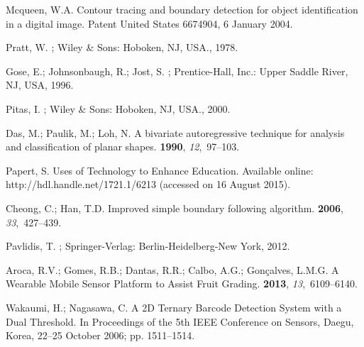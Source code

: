 \documentclass[sensors,article,accept,moreauthors,pdftex,10pt,a4paper]{mdpi}
\begin{document}
\begin{thebibliography}{999} 

Mcqueen, W.A.
\newblock Contour tracing and boundary detection for object identification in a
 digital image.
\newblock Patent United States 6674904, 6 January 2004.

Pratt, W.
; Wiley \& Sons: Hoboken, NJ, USA., 1978.

Gose, E.; Johnsonbaugh, R.; Jost, S.
; Prentice-Hall, Inc.:
 Upper Saddle River, NJ, USA, 1996.

Pitas, I.
; Wiley \& Sons: Hoboken, NJ, USA., 2000.

Das, M.; Paulik, M.; Loh, N.
\newblock A bivariate autoregressive technique for analysis and classification
 of planar shapes.
 {\bf 1990}, {\em 12},~97--103.

Papert, S.
\newblock Uses of Technology to Enhance Education. Available online: http://hdl.handle.net/1721.1/6213 (accessed on 16 August 2015).

Cheong, C.; Han, T.D.
\newblock Improved simple boundary following algorithm.
 {\bf 2006}, {\em 33},~427--439.

Pavlidis, T.
; Springer-Verlag: Berlin-Heidelberg-New York, 2012.

Aroca, R.V.; Gomes, R.B.; Dantas, R.R.; Calbo, A.G.; Gonçalves, L.M.G.
\newblock A Wearable Mobile Sensor Platform to Assist Fruit Grading.
 {\bf 2013}, {\em 13},~6109--6140.

Wakaumi, H.; Nagasawa, C.
\newblock A 2D Ternary Barcode Detection System with a Dual Threshold.
\newblock In Proceedings of the 5th IEEE Conference on Sensors, Daegu, Korea, 22--25 October 2006; pp. 1511--1514.


\end{thebibliography}
\end{document}
